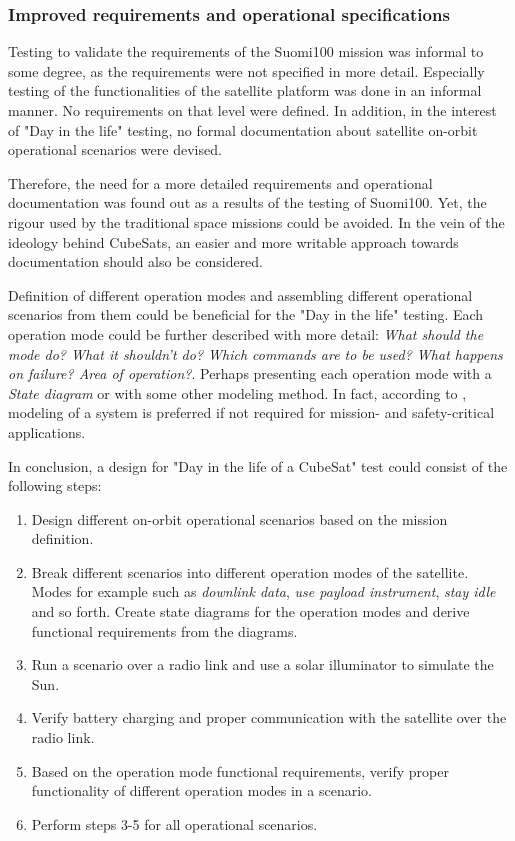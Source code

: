 \documentclass[english,12pt,a4paper,pdftex,elec,utf8]{aaltothesis}
\begin{document}
\subsubsection{Improved requirements and operational specifications}
Testing to validate the requirements of the Suomi100 mission was informal to some degree, as the requirements were not specified in more detail. Especially testing of the functionalities of the satellite platform was done in an informal manner. No requirements on that level were defined. In addition, in the interest of "Day in the life" testing, no formal documentation about satellite on-orbit operational scenarios were devised.\par 
Therefore, the need for a more detailed requirements and operational documentation was found out as a results of the testing of Suomi100. Yet, the rigour used by the traditional space missions could be avoided. In the vein of the ideology behind CubeSats, an easier and more writable approach towards documentation should also be considered.\par 
Definition of different operation modes and assembling different operational scenarios from them could be beneficial for the "Day in the life" testing. Each operation mode could be further described with more detail: \textit{What should the mode do? What it shouldn't do? Which commands are to be used? What happens on failure? Area of operation?}. Perhaps presenting each operation mode with a \textit{State diagram} or with some other modeling method. In fact, according to \cite{embeddedsofteng}, modeling of a system is preferred if not required for mission- and safety-critical applications.\par 
In conclusion, a design for "Day in the life of a CubeSat" test could consist of the following steps:
\begin{enumerate}
\item Design different on-orbit operational scenarios based on the mission definition.
\item Break different scenarios into different operation modes of the satellite. Modes for example such as \textit{downlink data}, \textit{use payload instrument}, \textit{stay idle} and so forth. Create state diagrams for the operation modes and derive functional requirements from the diagrams.
\item Run a scenario over a radio link and use a solar illuminator to simulate the Sun.
\item Verify battery charging and proper communication with the satellite over the radio link.
\item Based on the operation mode functional requirements, verify proper functionality of different operation modes in a scenario.
\item Perform steps 3-5 for all operational scenarios. 
\end{enumerate}
\end{document}
